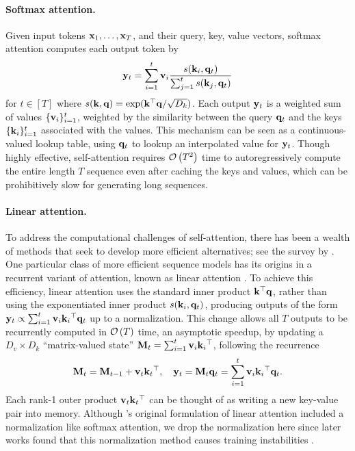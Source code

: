 \documentclass[notitlepage, 11pt]{article}
\newcommand*{\dkey}{{D_k}}
\newcommand*{\dval}{{D_v}}
\begin{document}
\paragraph{Softmax attention.}
Given input tokens $\mathbf{x}_1, \ldots, \mathbf{x}_T$, and their query, key, value vectors, softmax attention \citep{Vaswani2017AttentionAllYou} computes each output token by
\begin{align}
    \mathbf{y}_t = \sum_{i=1}^t \mathbf{v}_i \frac{s(\mathbf{k}_i, \mathbf{q}_t)}{\sum_{j=1}^t s(\mathbf{k}_j, \mathbf{q}_t)} \label{eqn:softmax-attention}
\end{align}
for $t\in [T]$ where $s(\kbf, \qbf) = \exp(\kbf\transpose\qbf/\sqrt{\dkey})$.
Each output $\mathbf{y}_t$ is a weighted sum of values $\{\mathbf{v}_i\}_{i=1}^t$, weighted by the similarity between the query $\mathbf{q}_t$ and the keys $\{\mathbf{k}_i\}_{i=1}^t$ associated with the values.
This mechanism can be seen as a continuous-valued lookup table, using $\mathbf{q}_t$ to lookup an interpolated value for $\mathbf{y}_t$.
Though highly effective, self-attention requires $\mathcal{O}\left( T^2 \right)$ time to autoregressively compute the entire length $T$ sequence even after caching the keys and values, which can be prohibitively slow for generating long sequences.

\paragraph{Linear attention.}
To address the computational challenges of self-attention, there has been a wealth of methods that seek to develop more efficient alternatives; see the survey by \citet{Tay2022EfficientTransformersSurvey}.
One particular class of more efficient sequence models has its origins in a recurrent variant of attention, known as linear attention \citep{Katharopoulos2020TransformersAreRNNs}.
To achieve this efficiency, linear attention uses the standard inner product $\mathbf{k}{}^\top \mathbf{q}$, rather than using the exponentiated inner product $s(\mathbf{k}_i, \mathbf{q}_t)$, producing outputs of the form $\mathbf{y}_t \propto \sum_{i=1}^t \mathbf{v}_i\mathbf{k}_i{}^\top\mathbf{q}_t$ up to a normalization.
This change allows all $T$ outputs to be recurrently computed in $\mathcal{O}\left( T \right)$ time, an asymptotic speedup, by updating a $\dval\times \dkey$ ``matrix-valued state'' $\mathbf{M}_t = \sum_{i=1}^t\mathbf{v}_i\mathbf{k}_i{}^\top$, following the recurrence
\begin{align}
    \mathbf{M}_t = \mathbf{M}_{t-1} + \mathbf{v}_t\mathbf{k}_t{}^\top, \quad \mathbf{y}_t = \mathbf{M}_t \mathbf{q}_t = \sum_{i=1}^t \mathbf{v}_i\mathbf{k}_i{}^\top\mathbf{q}_t. \label{eqn:linear-attention-recurrence}
\end{align}
Each rank-1 outer product $\mathbf{v}_t\mathbf{k}_t{}^\top$ can be thought of as writing a new key-value pair into memory.
Although \citet{Katharopoulos2020TransformersAreRNNs}'s original formulation of linear attention included a normalization like softmax attention, we drop the normalization here since later works found that this normalization method causes training instabilities \citep{Qin2022DevilLinearTransformer,Dao2024TransformersAreSSMs} .
\end{document}
